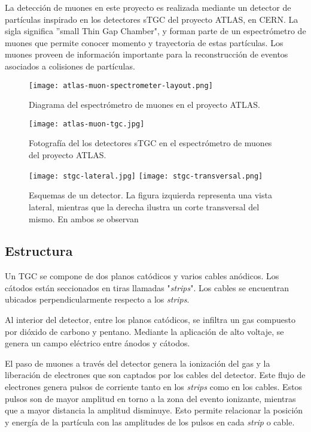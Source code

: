 
La detección de muones en este proyecto es realizada mediante un detector de partículas inspirado en los detectores sTGC del proyecto ATLAS, en CERN. La sigla significa ''small Thin Gap Chamber", y forman parte de un espectrómetro de muones que permite conocer momento y trayectoria de estas partículas. Los muones proveen de información importante para la reconstrucción de eventos asociados a colisiones de partículas.

\begin{figure}[h]
	\centering
	\texttt{[image: atlas-muon-spectrometer-layout.png]}
	\caption{Diagrama del espectrómetro de muones en el proyecto ATLAS\cite{AtlasMuonDiagram}.}
	\label{img:atlas-layout}
\end{figure}

\newpage
\begin{figure}[h]
	\centering
	\texttt{[image: atlas-muon-tgc.jpg]}
	\caption{Fotografía del los detectores sTGC en el espectrómetro de muones del proyecto ATLAS\cite{AtlasMuonSpect}.}
	\label{img:atlas-tgc}
\end{figure}

\begin{figure}[h]
	\centering
	\texttt{[image: stgc-lateral.jpg]}
	\texttt{[image: stgc-transversal.png]}
	\caption{Esquemas de un detector. La figura izquierda representa una vista lateral, mientras que la derecha ilustra un corte transversal del mismo. En ambos se observan  }
	\label{img:stgc-diagrams}
\end{figure}

\newpage
\subsection*{Estructura}

	Un TGC se compone de dos planos catódicos y varios cables anódicos. Los cátodos están seccionados en tiras llamadas "\textit{strips}". Los cables se encuentran ubicados perpendicularmente respecto a los \textit{strips}.
	
	Al interior del detector, entre los planos catódicos, se infiltra un gas compuesto por dióxido de carbono y pentano. Mediante la aplicación de alto voltaje, se genera un campo eléctrico entre ánodos y cátodos.
	
	El paso de muones a través del detector genera la ionización del gas y la liberación de electrones que son captados por los cables del detector. Este flujo de electrones genera pulsos de corriente tanto en los \textit{strips} como en los cables. Estos pulsos son de mayor amplitud en torno a la zona del evento ionizante, mientras que a mayor distancia la amplitud disminuye. Esto permite relacionar la posición y energía de la partícula con las amplitudes de los pulsos en cada \textit{strip} o cable.

